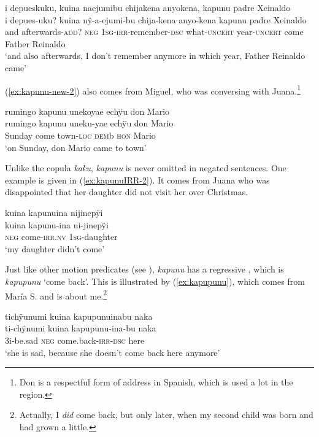 \ea\label{ex:kapunu-4}
\begingl
\glpreamble i depueskuku, kuina naejumibu chijakena anyokena, kapunu padre Xeinaldo\\
\gla i depues-uku? kuina nÿ-a-ejumi-bu chija-kena anyo-kena kapunu {padre Xeinaldo}\\
\glb and afterwards-\textsc{add}? \textsc{neg} 1\textsc{sg}-\textsc{irr}-remember-\textsc{dsc} what-\textsc{uncert} year-\textsc{uncert} come {Father Reinaldo}\\
\glft ‘and also afterwards, I don’t remember anymore in which year, Father Reinaldo came’
\endgl
\trailingcitation{[mxx-p110825l.150-151]}
\xe

(\ref{ex:kapunu-new-2}) also comes from Miguel, who was conversing with Juana.\footnote{Don is a
respectful form of address in Spanish, which is used a lot in the region.}

\ea\label{ex:kapunu-new-2}
\begingl
\glpreamble rumingo kapunu unekoyae echÿu don Mario\\
\gla rumingo kapunu uneku-yae echÿu don Mario\\
\glb Sunday come town-\textsc{loc} \textsc{dem}b \textsc{hon} Mario\\
\glft ‘on Sunday, don Mario came to town’
\endgl
\trailingcitation{[jmx-c120429ls-x5.141]}
\xe

Unlike the copula \textit{kaku}, \textit{kapunu} is never omitted in negated sentences. One example is given in (\ref{ex:kapunuIRR-2}). It comes from Juana who was disappointed that her daughter did not visit her over Christmas.

\ea\label{ex:kapunuIRR-2}
\begingl 
\glpreamble kuina kapunuina nijinepÿi\\
\gla kuina kapunu-ina ni-jinepÿi\\ 
\glb \textsc{neg} come-\textsc{irr.nv} 1\textsc{sg}-daughter\\ 
\glft ‘my daughter didn’t come’
\trailingcitation{[jxx-p120430l-1.317]}
\xe
{}

Just like other motion predicates (see ), \textit{kapunu} has a regressive , which is \textit{kapupunu} ‘come back’. This is illustrated by (\ref{ex:kapupunu}), which comes from María S. and is about me.\footnote{Actually, I \textit{did} come back, but only later, when my second child was born and had grown a little.} 

\ea\label{ex:kapupunu}
\begingl 
\glpreamble tichÿunumi kuina kapupunuinabu naka\\
\gla ti-chÿnumi kuina kapupunu-ina-bu naka\\ 
\glb 3i-be.sad \textsc{neg} come.back-\textsc{irr}-\textsc{dsc} here\\ 
\glft ‘she is sad, because she doesn’t come back here anymore’
\endgl
\trailingcitation{[rxx-e121128s-1.020]}
\xe
{}


